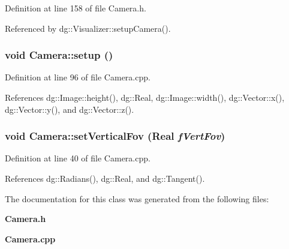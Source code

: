 Definition at line 158 of file Camera.h.

Referenced by dg::Visualizer::setup\-Camera().
\subsubsection{\setlength{\rightskip}{0pt plus 5cm}void Camera::setup ()}\label{classdg_1_1Camera_a2}




Definition at line 96 of file Camera.cpp.

References dg::Image::height(), dg::Real, dg::Image::width(), dg::Vector::x(), dg::Vector::y(), and dg::Vector::z().
\subsubsection{\setlength{\rightskip}{0pt plus 5cm}void Camera::set\-Vertical\-Fov ({\bf Real} {\em f\-Vert\-Fov})\hspace{0.3cm}{\tt  [inline]}}\label{classdg_1_1Camera_a21}




Definition at line 40 of file Camera.cpp.

References dg::Radians(), dg::Real, and dg::Tangent().

The documentation for this class was generated from the following files:\begin{CompactItemize}
\item 
{\bf Camera.h}\item 
{\bf Camera.cpp}\end{CompactItemize}
